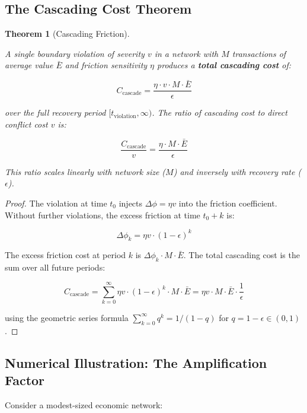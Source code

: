 \documentclass[11pt]{article}
\theoremstyle{plain}
\newtheorem{theorem}{Theorem}
\theoremstyle{definition}
\theoremstyle{remark}
\let\origsubsection\subsection
\renewcommand{\subsection}{\needspace{7\baselineskip}\origsubsection}
\begin{document}
\subsection{The Cascading Cost
Theorem}\label{the-cascading-cost-theorem}

\begin{theorem}[Cascading Friction]
\label{thm-cascading-friction}

A single boundary violation of severity $v$ in a network with $M$ transactions of average value $\bar{E}$ and friction sensitivity $\eta$ produces a \textbf{total cascading cost} of:

$$C_{\text{cascade}} = \frac{\eta \cdot v \cdot M \cdot \bar{E}}{\epsilon}$$

over the full recovery period $[t_{\text{violation}}, \infty)$. The ratio of cascading cost to direct conflict cost $v$ is:

$$\frac{C_{\text{cascade}}}{v} = \frac{\eta \cdot M \cdot \bar{E}}{\epsilon}$$

This ratio scales linearly with network size ($M$) and inversely with recovery rate ($\epsilon$).
\end{theorem}

\begin{proof}
The violation at time $t_0$ injects $\Delta\phi = \eta v$ into the friction coefficient. Without further violations, the excess friction at time $t_0 + k$ is:

$$\Delta\phi_k = \eta v \cdot (1 - \epsilon)^k$$

The excess friction cost at period $k$ is $\Delta\phi_k \cdot M \cdot \bar{E}$. The total cascading cost is the sum over all future periods:

$$C_{\text{cascade}} = \sum_{k=0}^{\infty} \eta v \cdot (1 - \epsilon)^k \cdot M \cdot \bar{E} = \eta v \cdot M \cdot \bar{E} \cdot \frac{1}{\epsilon}$$

using the geometric series formula $\sum_{k=0}^{\infty} q^k = 1/(1-q)$ for $q = 1 - \epsilon \in (0, 1)$.
\end{proof}

\subsection{Numerical Illustration: The Amplification
Factor}\label{numerical-illustration-the-amplification-factor}

Consider a modest-sized economic network:
\end{document}
